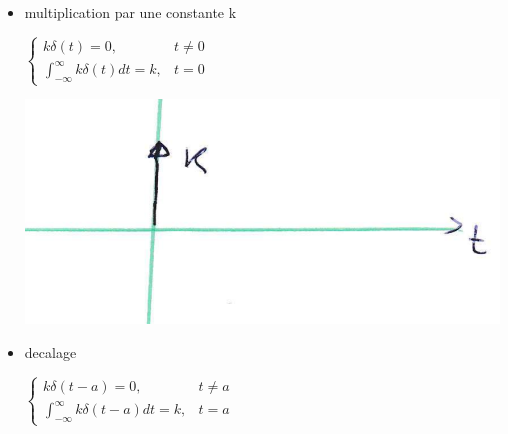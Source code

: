 \documentclass[12pt]{book}
\begin{document}
            \begin{itemize}
                \item multiplication par une constante k
                    \begin{center}
                        \begin{minipage}{0.49\linewidth}
                            $  
                            \begin{cases}
                                k\delta(t) =0 , & t \not = 0 \\
                                \int^\infty_{-\infty}k\delta(t)dt =k, & t =0
                            \end{cases}
                            $
                        \end{minipage}
                        \begin{minipage}{0.39\linewidth}
                            \includegraphics[width = \linewidth]{pic/kdeltadirac.png}
                        \end{minipage}
                    \end{center}
                \item decalage 
                    \begin{center}
                        \begin{minipage}{0.49\linewidth}
                            $  
                            \begin{cases}
                                k\delta(t-a) =0 , & t \not = a \\
                                \int^\infty_{-\infty}k\delta(t -a)dt =k, & t =a
                            \end{cases}
                            $
                        \end{minipage}
                        \begin{minipage}{0.39\linewidth}

\end{minipage}
\end{center}
\end{itemize}
\end{document}

